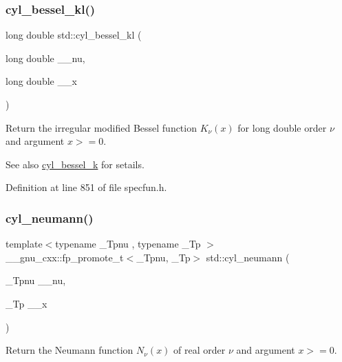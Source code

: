 \subsubsection{\texorpdfstring{cyl\+\_\+bessel\+\_\+kl()}{cyl\_bessel\_kl()}}
{\footnotesize\ttfamily long double std\+::cyl\+\_\+bessel\+\_\+kl (\begin{DoxyParamCaption}\item[{long double}]{\+\_\+\+\_\+nu,  }\item[{long double}]{\+\_\+\+\_\+x }\end{DoxyParamCaption})\hspace{0.3cm}{\ttfamily [inline]}}

Return the irregular modified Bessel function $ K_{\nu}(x) $ for {\ttfamily long double} order $ \nu $ and argument $ x >= 0 $.

\begin{DoxySeeAlso}{See also}
\hyperlink{group__mathsf__std_gac73d664b8e7ceba7f8e786c93e97a084}{cyl\+\_\+bessel\+\_\+k} for setails. 
\end{DoxySeeAlso}


Definition at line 851 of file specfun.\+h.

\mbox{\label{group__mathsf__std_ga1e4bef23704469b0704cf15c5f04e29e}} 
\subsubsection{\texorpdfstring{cyl\+\_\+neumann()}{cyl\_neumann()}}
{\footnotesize\ttfamily template$<$typename \+\_\+\+Tpnu , typename \+\_\+\+Tp $>$ \\
\+\_\+\+\_\+gnu\+\_\+cxx\+::fp\+\_\+promote\+\_\+t$<$\+\_\+\+Tpnu, \+\_\+\+Tp$>$ std\+::cyl\+\_\+neumann (\begin{DoxyParamCaption}\item[{\+\_\+\+Tpnu}]{\+\_\+\+\_\+nu,  }\item[{\+\_\+\+Tp}]{\+\_\+\+\_\+x }\end{DoxyParamCaption})\hspace{0.3cm}{\ttfamily [inline]}}

Return the Neumann function $ N_{\nu}(x) $ of real order $ \nu $ and argument $ x >= 0 $.

